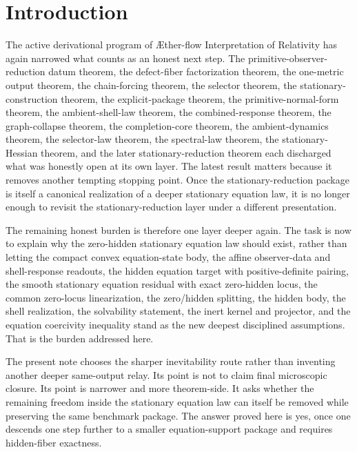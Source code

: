 \documentclass[11pt]{article}
\newcommand{\Aflow}{\AE{}ther-flow}
\newcommand{\TheoryName}{\Aflow{} Interpretation of Relativity}
\begin{document}
\section{Introduction}

The active derivational program of \TheoryName{} has again narrowed what counts as an honest next step. The primitive-observer-reduction datum theorem, the defect-fiber factorization theorem, the one-metric output theorem, the chain-forcing theorem, the selector theorem, the stationary-construction theorem, the explicit-package theorem, the primitive-normal-form theorem, the ambient-shell-law theorem, the combined-response theorem, the graph-collapse theorem, the completion-core theorem, the ambient-dynamics theorem, the selector-law theorem, the spectral-law theorem, the stationary-Hessian theorem, and the later stationary-reduction theorem each discharged what was honestly open at its own layer. The latest result matters because it removes another tempting stopping point. Once the stationary-reduction package is itself a canonical realization of a deeper stationary equation law, it is no longer enough to revisit the stationary-reduction layer under a different presentation.

The remaining honest burden is therefore one layer deeper again. The task is now to explain why the zero-hidden stationary equation law should exist, rather than letting the compact convex equation-state body, the affine observer-data and shell-response readouts, the hidden equation target with positive-definite pairing, the smooth stationary equation residual with exact zero-hidden locus, the common zero-locus linearization, the zero/hidden splitting, the hidden body, the shell realization, the solvability statement, the inert kernel and projector, and the equation coercivity inequality stand as the new deepest disciplined assumptions. That is the burden addressed here.

The present note chooses the sharper inevitability route rather than inventing another deeper same-output relay. Its point is not to claim final microscopic closure. Its point is narrower and more theorem-side. It asks whether the remaining freedom inside the stationary equation law can itself be removed while preserving the same benchmark package. The answer proved here is yes, once one descends one step further to a smaller equation-support package and requires hidden-fiber exactness.
\end{document}
